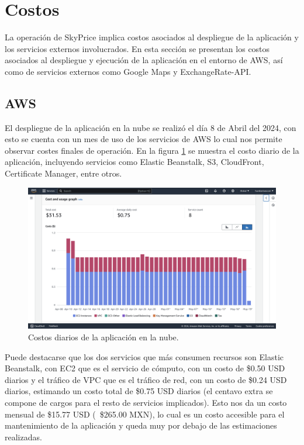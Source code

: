 \section{Costos}
La operación de SkyPrice implica costos asociados al despliegue de la aplicación
y los servicios externos involucrados. En esta sección se presentan los costos
asociados al despliegue y ejecución de la aplicación en el entorno de AWS, así como
de servicios externos como Google Maps y ExchangeRate-API.

\subsection{AWS}
El despliegue de la aplicación en la nube se realizó el día 8 de Abril del 2024,
con esto se cuenta con un mes de uso de los servicios de AWS lo cual nos
permite observar costes finales de operación. En la figura \ref{fig:costos-diarios}
se muestra el costo diario de la aplicación, incluyendo servicios como Elastic Beanstalk,
S3, CloudFront, Certificate Manager, entre otros.

\begin{figure}[H]
    \centering
    \includegraphics[width=1.0\textwidth]{imagenes/05-implementacion/costos/costos-diarios.png}
    \caption{Costos diarios de la aplicación en la nube.}
    \label{fig:costos-diarios}
\end{figure}

Puede destacarse que los dos servicios que más consumen recursos son Elastic Beanstalk,
con EC2 que es el servicio de cómputo, con un costo de \$0.50 USD diarios y el
tráfico de VPC que es el tráfico de red, con un costo de \$0.24 USD diarios,
estimando un costo total de \$0.75 USD diarios (el centavo extra se compone de cargos
para el resto de servicios implicados). Esto nos da un costo mensual
de \$15.77 USD (~\$265.00 MXN), lo cual es un costo accesible para el mantenimiento de la aplicación
y queda muy por debajo de las estimaciones realizadas.

